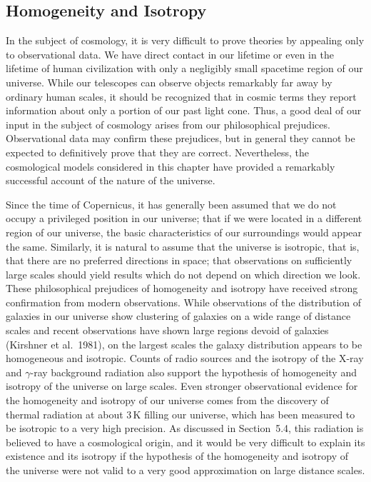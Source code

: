 
\subsection{Homogeneity and Isotropy}\label{sec:5.1}

In the subject of cosmology, it is very difficult to prove theories by appealing only
to observational data. We have direct contact in our lifetime or even in the lifetime
of human civilization with only a negligibly small spacetime region of our universe.
While our telescopes can observe objects remarkably far away by ordinary human
scales, it should be recognized that in cosmic terms they report information about
only a portion of our past light cone. Thus, a good deal of our input in the subject
of cosmology arises from our philosophical prejudices. Observational data may
confirm these prejudices, but in general they cannot be expected to definitively prove
that they are correct. Nevertheless, the cosmological models considered in this
chapter have provided a remarkably successful account of the nature of the universe.

Since the time of Copernicus, it has generally been assumed that we do not occupy
a privileged position in our universe; that if we were located in a different region of
our universe, the basic characteristics of our surroundings would appear the same.
Similarly, it is natural to assume that the universe is isotropic, that is, that there are
no preferred directions in space; that observations on sufficiently large scales should
yield results which do not depend on which direction we look. These philosophical
prejudices of homogeneity and isotropy have received strong confirmation from
modern observations. While observations of the distribution of galaxies in our
universe show clustering of galaxies on a wide range of distance scales and recent
observations have shown large regions devoid of galaxies (Kirshner et al. 1981), on
the largest scales the galaxy distribution appears to be homogeneous and isotropic.
Counts of radio sources and the isotropy of the X-ray and \(\gamma\)-ray background
radiation also support the hypothesis of homogeneity and isotropy of the universe on
large scales. Even stronger observational evidence for the homogeneity and isotropy
of our universe comes from the discovery of thermal radiation at about \(3\,\mathrm{K}\)
filling our universe, which has been measured to be isotropic to a very high
precision. As discussed in Section~5.4, this radiation is believed to have a
cosmological origin, and it would be very difficult to explain its existence and its
isotropy if the hypothesis of the homogeneity and isotropy of the universe were not
valid to a very good approximation on large distance scales.

